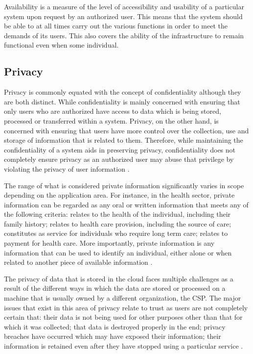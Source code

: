Availability \cite{Kissel2013} is a measure of the level of accessibility and usability of a particular system upon request by an authorized user. This means that the system should be able to at all times carry out the various functions in order to meet the demands of its users. This also covers the ability of the infrastructure to remain functional even when some individual.

\subsection{Privacy}

Privacy is commonly equated with the concept of confidentiality although they are both distinct. While confidentiality is mainly concerned with ensuring that only users who are authorized have access to data which is being stored, processed or transferred within a system. Privacy, on the other hand, is concerned with ensuring that users have more control over the collection, use and storage of information that is related to them. Therefore, while maintaining the confidentiality of a system aids in preserving privacy, confidentiality does not completely ensure privacy as an authorized user may abuse that privilege by violating the privacy of user information \cite{pearsonprivacy}.

The range of what is considered private information significantly varies in scope depending on the application area. For instance, in the health sector, private information can be regarded as any oral or written information that meets any of the following criteria: relates to the health of the individual, including their family history; relates to health care provision, including the source of care; constitutes as service for individuals who require long term care; relates to payment for health care. More importantly, private information is any information that can be used to identify an individual, either alone or when related to another piece of available information \cite{annpia}.

The privacy of data that is stored in the cloud faces multiple challenges as a result of the different ways in which the data are stored or processed on a machine that is usually owned by a different organization, the CSP. The major issues that exist in this area of privacy relate to trust as users are not completely certain that: their data is not being used for other purposes other than that for which it was collected; that data is destroyed properly in the end; privacy breaches have occurred which may have exposed their information; their information is retained even after they have stopped using a particular service \cite{pearsonprivacy}.

